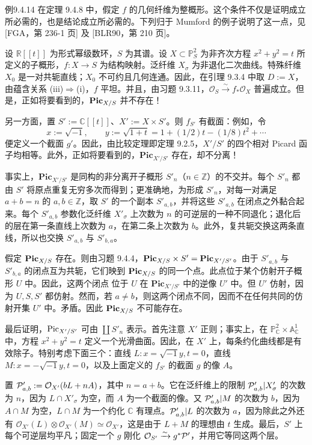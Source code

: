 \begin{origstatement}{例}{9.4.14}\label{ch09s04:9.4.14}
在定理 9.4.8 中，假定 $f$ 的几何纤维为整概形。这个条件不仅是证明成立所必需的，也是结论成立所必需的。下列归于 Mumford 的例子说明了这一点，见 [FGA，第 236-1 页] 及 [BLR90，第 210 页]。

设 $\mathbb R[[t]]$ 为形式幂级数环，$S$ 为其谱。设 $X\subset\mathbb P_S^2$ 为非齐次方程 $x^2+y^2=t$ 所定义的子概形，$f:X\to S$ 为结构映射。泛纤维 $X_\sigma$ 为非退化二次曲线。特殊纤维 $X_0$ 是一对共轭直线；$X_0$ 不可约且几何连通。因此，在引理 9.3.4 中取 $D:=X$，由蕴含关系 (iii)$\Rightarrow$(i)，$f$ 平坦。并且，由习题 9.3.11，$\mathcal O_S\xrightarrow{\sim}f_*\mathcal O_X$ 普遍成立。但是，正如将要看到的，$\mathbf{Pic}_{X/S}$ 并不存在！

另一方面，置 $S':=\mathbb C[[t]]$、$X':=X\times S'$。则 $f_{S'}$ 有截面：例如，令
\[
x:=\sqrt{-1},\qquad y:=\sqrt{1+t}=1+(1/2)t-(1/8)t^2+\cdots
\]
便定义一个截面 $g'$。因此，由比较定理即定理 9.2.5，$X'/S'$ 的四个相对 Picard 函子均相等。此外，正如将要看到的，$\mathbf{Pic}_{X'/S'}$ 存在，却不分离！

事实上，$\mathbf{Pic}_{X'/S'}$ 是同构的非分离开子概形 $S'_n$（$n\in\mathbb Z$）的不交并。每个 $S'_n$ 都由 $S'$ 将原点重复无穷多次而得到；更准确地，为形成 $S'_n$，对每一对满足 $a+b=n$ 的 $a,b\in\mathbb Z$，取 $S'$ 的一个副本 $S'_{a,b}$，并将这些 $S'_{a,b}$ 在闭点之外黏合起来。每个 $S'_{a,b}$ 参数化泛纤维 $X'_\sigma$ 上次数为 $n$ 的可逆层的一种不同退化；退化后的层在第一条直线上次数为 $a$，在第二条上次数为 $b$。此外，复共轭交换这两条直线，所以也交换 $S'_{a,b}$ 与 $S'_{b,a}$。

假定 $\mathbf{Pic}_{X/S}$ 存在。则由习题 9.4.4，$\mathbf{Pic}_{X/S}\times S'=\mathbf{Pic}_{X'/S'}$。由于 $S'_{a,b}$ 与 $S'_{b,a}$ 的闭点互为共轭，它们映到 $\mathbf{Pic}_{X/S}$ 的同一个点。此点位于某个仿射开子概形 $U$ 中。因此，这两个闭点
位于 $U$ 在 $\mathbf{Pic}_{X'/S'}$ 中的逆像 $U'$ 中。但 $U'$ 仿射，因为 $U,S,S'$ 都仿射。然而，若 $a\ne b$，则这两个闭点不同，因而不在任何共同的仿射开集 $U'$ 中。矛盾。因此 $\mathbf{Pic}_{X/S}$ 不可能存在。

最后证明，$\operatorname{Pic}_{X'/S'}$ 可由 $\coprod S'_n$ 表示。首先注意 $X'$ 正则；事实上，在 $\mathbb P_{\mathbb C}^2\times\mathbb A_{\mathbb C}^1$ 中，方程 $x^2+y^2=t$ 定义一个光滑曲面。因此，在 $X'$ 上，每条约化曲线都是有效除子。特别考虑下面三个：直线 $L:x=\sqrt{-1}y,t=0$，直线 $M:x=-\sqrt{-1}y,t=0$，以及上面定义的 $f_{S'}$ 的截面 $g$ 的像 $A$。

置 $\mathcal P'_{a,b}:=\mathcal O_{X'}(bL+nA)$，其中 $n=a+b$。它在泛纤维上的限制 $\mathcal P'_{a,b}|X'_\sigma$ 的次数为 $n$，因为 $L\cap X'_\sigma$ 为空，而 $A$ 为一个截面的像。又 $\mathcal P'_{a,b}|M$ 的次数为 $b$，因为 $A\cap M$ 为空，$L\cap M$ 为一个约化 $\mathbb C$ 有理点。$\mathcal P'_{a,b}|L$ 的次数为 $a$，因为除此之外还有 $\mathcal O_{X'}(L)\otimes\mathcal O_{X'}(M)\simeq\mathcal O_{X'}$，这是由于 $L+M$ 的理想由 $t$ 生成。最后，$S'$ 上每个可逆层均平凡；固定一个 $g$ 刚化 $\mathcal O_{S'}\xrightarrow{\sim}g^*\mathcal P'$，并用它等同这两个层。


\end{origstatement}
